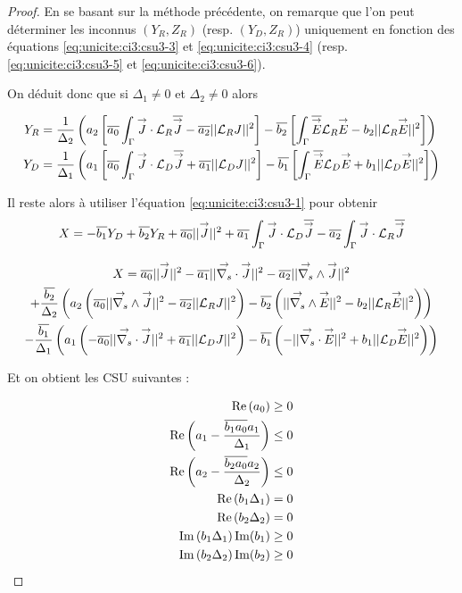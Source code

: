   \begin{proof}
    En se basant sur la méthode précédente, on remarque que l'on peut déterminer les inconnus \((Y_R,Z_R)\) (resp. \((Y_D,Z_R)\)) uniquement en fonction des équations \eqref{eq:unicite:ci3:csu3-3} et \eqref{eq:unicite:ci3:csu3-4} (resp. \eqref{eq:unicite:ci3:csu3-5} et \eqref{eq:unicite:ci3:csu3-6}).

    On déduit donc que si \(\Delta_1 \not = 0\) et \(\Delta_2 \not = 0\) alors

    \begin{align}
      Y_R &= \frac{1}{\Delta_2}\left(a_2\left[\conj{a_0}\int_\Gamma \vJ\cdot\LR\conj{\vJ} - \conj{a_2}||\LR J||^2\right]  -\conj{b_2}\left[\int_\Gamma \conj{\vE}\LR{\vE} - b_2 ||\LR \vE ||^2\right]\right) \\
      Y_D &= \frac{1}{\Delta_1}\left(a_1\left[\conj{a_0}\int_\Gamma \vJ\cdot\LD\conj{\vJ} + \conj{a_1}||\LD J||^2\right]  -\conj{b_1}\left[\int_\Gamma \conj{\vE}\LD{\vE} + b_1 ||\LD \vE ||^2\right]\right)
    \end{align}

    Il reste alors à utiliser l'équation \eqref{eq:unicite:ci3:csu3-1} pour obtenir
    \begin{equation}
      X = -\conj{b_1} Y_D + \conj{b_2} Y_R + \conj{a_0} || \vJ ||^2 + \conj{a_1} \int_\Gamma \vJ \cdot \LD \conj{\vJ} - \conj{a_2} \int_\Gamma \vJ \cdot \LR \conj{\vJ}
    \end{equation}

    \begin{multline}
      X = \conj{a_0} || \vJ ||^2 - \conj{a_1} || \vdivs \vJ ||^2 - \conj{a_2} || \vrots \vJ ||^2\\
      + \frac{\conj{b_2}}{\Delta_2}\left(a_2\left(\conj{a_0}||\vrots \vJ||^2 - \conj{a_2}||\LR J||^2\right)  -\conj{b_2}\left(||\vrots\vE||^2 - b_2 ||\LR \vE ||^2\right)\right) \\
      - \frac{\conj{b_1}}{\Delta_1}\left(a_1\left(-\conj{a_0}||\vdivs\vJ||^2 + \conj{a_1}||\LD J||^2\right)  -\conj{b_1}\left(-||\vdivs\vE||^2 + b_1 ||\LD \vE ||^2\right)\right)
    \end{multline}

    Et on obtient les CSU suivantes :

    \begin{align}
      \Re\left(a_0\right)\ge 0 \\
      \Re\left(a_1 - \frac{\conj{b_1a_0}a_1}{\Delta_1}\right) \le 0 \\
      \Re\left(a_2 - \frac{\conj{b_2a_0}a_2}{\Delta_2}\right) \le 0 \\
      \Re\left(b_1\Delta_1\right) = 0 \\
      \Re\left(b_2\Delta_2\right) = 0 \\
      \Im\left(b_1\Delta_1\right)\Im(b_1)\ge 0\\
      \Im\left(b_2\Delta_2\right)\Im(b_2)\ge 0
    \end{align}
  \end{proof}

